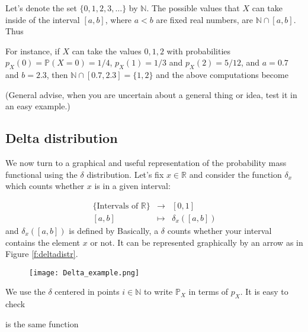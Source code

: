 Let's denote the set $\{0,1,2,3,\ldots\}$ by $\mathbb N$. The possible values that $X$ can take inside of the interval $[a,b]$, where $a < b$ are fixed real numbers, are $\mathbb N \cap [a,b]$. Thus 
\begin{example}
\label{ex:just_an_example}
 For instance, if $X$ can take the values $0,1,2$ with probabilities $p_X(0) = \mathbb P(X = 0 ) = 1/4$, $p_X(1) = 1/3$ and $p_X(2) = 5/12$, and $a = 0.7$ and $b = 2.3$, then $\mathbb N \cap [0.7,2.3] = \{1,2\}$ and the above computations become 

(General advise, when you are uncertain about a general thing or idea, test it in an easy example.)
\end{example}

\subsection{Delta distribution}
We now turn to a graphical and useful representation of the probability mass functional using the $\delta$ distribution. 
Let's fix $x \in \mathbb R $ and consider the function $\delta_x$ which counts whether $x$ is in a given interval: 

 $$
 \begin{array}{ccc}
 \{\textrm{Intervals of $\mathbb R$}\} & \to & [0,1] \\
 \textrm{$[a,b]$} & \mapsto & \delta_x([a,b])
 \end{array}
 $$
and $\delta_x([a,b])$ is defined by 
Basically, a $\delta$ counts whether your interval contains the element $x$  or not. It can be represented graphically by an arrow as in Figure  \eqref{f:deltadistr}.
 \begin{figure}[h]
\texttt{[image: Delta\_example.png]}
\label{f:deltadistr}
\end{figure}
We use the $\delta$ centered in points $i \in \mathbb N$ to write $\mathbb P_X$ in terms of $p_X$. 
It is easy to check
\begin{proposition}
is the same function
\end{proposition}

